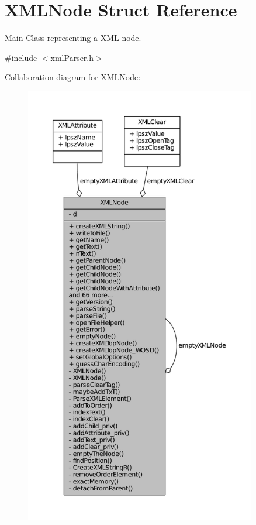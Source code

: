 \hypertarget{structXMLNode}{\section{X\-M\-L\-Node Struct Reference}
\label{structXMLNode}
}


Main Class representing a X\-M\-L node.  




{\ttfamily \#include $<$xml\-Parser.\-h$>$}



Collaboration diagram for X\-M\-L\-Node\-:
\nopagebreak
\begin{figure}[H]
\begin{center}
\leavevmode
\includegraphics[height=550pt]{structXMLNode__coll__graph}
\end{center}
\end{figure}
